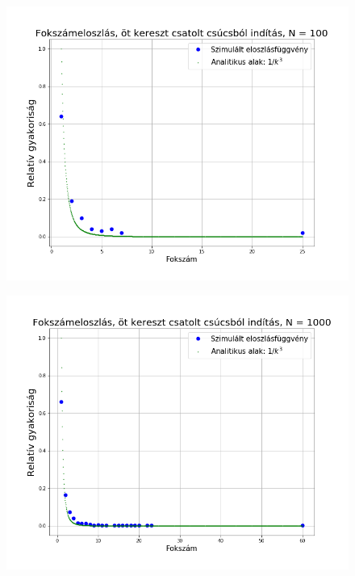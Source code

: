 \documentclass[a4paper, 12pt]{article}
\numberwithin{equation}{section}          %
\numberwithin{figure}{subsection}
\begin{document}
\begin{figure}[ch!]
	\begin{center}
		\includegraphics[width=1\textwidth]{harmadik100.png}
	\end{center}
\end{figure}
\clearpage
\begin{figure}[c!]
	\begin{center}
		\includegraphics[width=1\textwidth]{harmadik1000.png}
	\end{center}
\end{figure}
\clearpage
\end{document}
